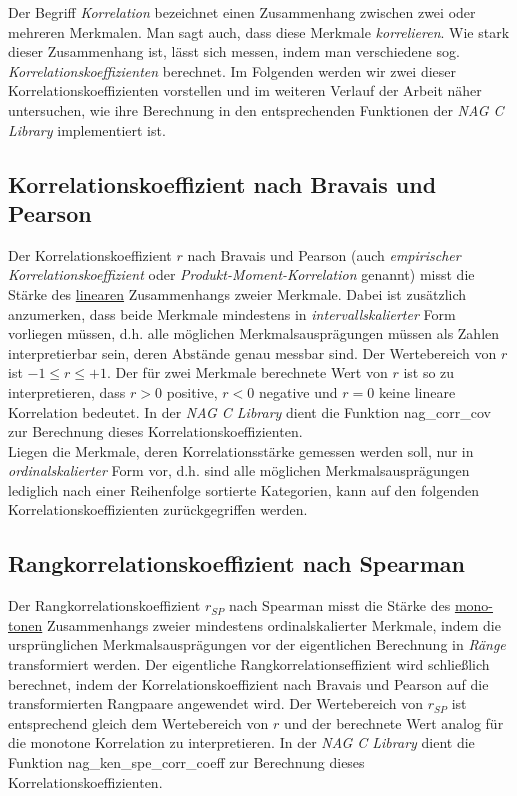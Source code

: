 \documentclass{article}
\begin{document}
Der Begriff {\it Korrelation} bezeichnet einen Zusammenhang zwischen zwei oder mehreren Merkmalen. Man sagt auch, dass diese Merkmale {\it korrelieren}. Wie stark dieser Zusammenhang ist, lässt sich messen, indem man verschiedene sog. {\it Korrelationskoeffizienten} berechnet. Im Folgenden werden wir zwei dieser Korrelationskoeffizienten vorstellen und im weiteren Verlauf der Arbeit näher untersuchen, wie ihre Berechnung in den entsprechenden Funktionen der {\it NAG C Library} implementiert ist.

\subsection{Korrelationskoeffizient nach Bravais und Pearson}

Der Korrelationskoeffizient $r$ nach Bravais und Pearson (auch {\it empirischer Korrelationskoeffizient} oder {\it Produkt-Moment-Korrelation} genannt) misst die Stärke des \underline{linearen} Zusammenhangs zweier Merkmale. Dabei ist zusätzlich anzumerken, dass beide Merkmale mindestens in {\it intervallskalierter} Form vorliegen müssen, d.h. alle möglichen Merkmalsausprägungen müssen als Zahlen interpretierbar sein, deren Abstände genau messbar sind. Der Wertebereich von $r$ ist $-1 \leq r \leq +1$. Der für zwei Merkmale berechnete Wert von $r$ ist so zu interpretieren, dass $r > 0$ positive, $r < 0$ negative und $r = 0$ keine lineare Korrelation bedeutet. In der {\it NAG C Library} dient die Funktion nag\_corr\_cov zur Berechnung dieses Korrelationskoeffizienten.\\
Liegen die Merkmale, deren Korrelationsstärke gemessen werden soll, nur in {\it ordinalskalierter} Form vor, d.h. sind alle möglichen Merkmalsausprägungen lediglich nach einer Reihenfolge sortierte Kategorien, kann auf den folgenden Korrelationskoeffizienten zurückgegriffen werden.

\subsection{Rangkorrelationskoeffizient nach Spearman}

Der Rangkorrelationskoeffizient $r_{SP}$ nach Spearman misst die Stärke des \underline{mono-}\\\underline{tonen} Zusammenhangs zweier mindestens ordinalskalierter Merkmale, indem die ursprünglichen Merkmalsausprägungen vor der eigentlichen Berechnung in {\it Ränge} transformiert werden. Der eigentliche Rangkorrelationseffizient wird schließlich berechnet, indem der Korrelationskoeffizient nach Bravais und Pearson auf die transformierten Rangpaare angewendet wird. Der Wertebereich von $r_{SP}$ ist entsprechend gleich dem Wertebereich von $r$ und der berechnete Wert analog für die monotone Korrelation zu interpretieren. In der {\it NAG C Library} dient die Funktion nag\_ken\_spe\_corr\_coeff zur Berechnung dieses Korrelationskoeffizienten.
\end{document}
